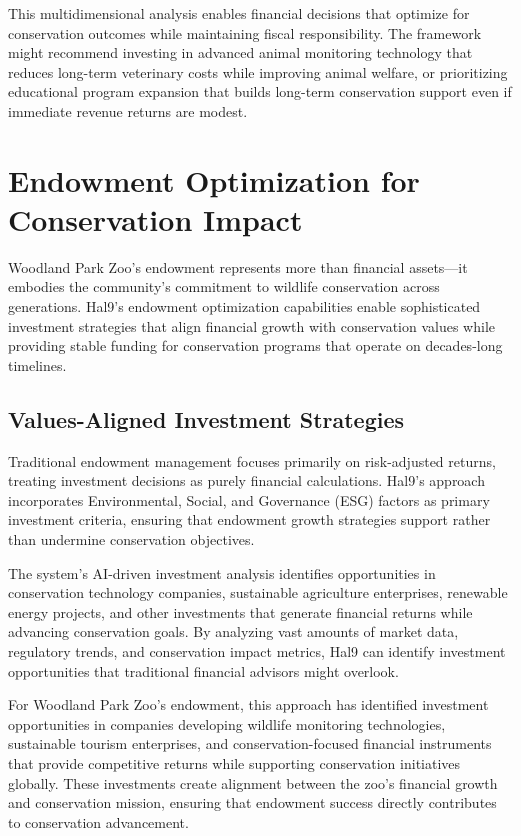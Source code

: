 \documentclass[
  Letterpaper,
]{scrbook}
\begin{document}
This multidimensional analysis enables financial decisions that optimize
for conservation outcomes while maintaining fiscal responsibility. The
framework might recommend investing in advanced animal monitoring
technology that reduces long-term veterinary costs while improving
animal welfare, or prioritizing educational program expansion that
builds long-term conservation support even if immediate revenue returns
are modest.

\section{Endowment Optimization for Conservation
Impact}\label{endowment-optimization-for-conservation-impact}

Woodland Park Zoo's endowment represents more than financial assets---it
embodies the community's commitment to wildlife conservation across
generations. Hal9's endowment optimization capabilities enable
sophisticated investment strategies that align financial growth with
conservation values while providing stable funding for conservation
programs that operate on decades-long timelines.

\subsection{Values-Aligned Investment
Strategies}\label{values-aligned-investment-strategies}

Traditional endowment management focuses primarily on risk-adjusted
returns, treating investment decisions as purely financial calculations.
Hal9's approach incorporates Environmental, Social, and Governance (ESG)
factors as primary investment criteria, ensuring that endowment growth
strategies support rather than undermine conservation objectives.

The system's AI-driven investment analysis identifies opportunities in
conservation technology companies, sustainable agriculture enterprises,
renewable energy projects, and other investments that generate financial
returns while advancing conservation goals. By analyzing vast amounts of
market data, regulatory trends, and conservation impact metrics, Hal9
can identify investment opportunities that traditional financial
advisors might overlook.

For Woodland Park Zoo's endowment, this approach has identified
investment opportunities in companies developing wildlife monitoring
technologies, sustainable tourism enterprises, and conservation-focused
financial instruments that provide competitive returns while supporting
conservation initiatives globally. These investments create alignment
between the zoo's financial growth and conservation mission, ensuring
that endowment success directly contributes to conservation advancement.
\end{document}

